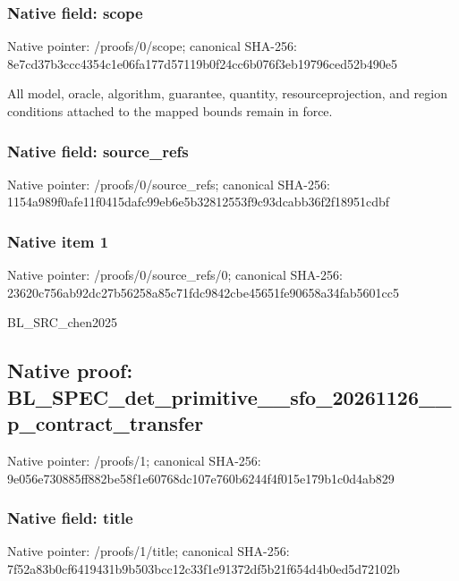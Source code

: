 \documentclass[10pt,a4paper]{article}
\begin{document}
\subsubsection{Native field: scope}


Native pointer: /proofs/0/scope; canonical SHA-256: 8e7cd37b3ccc4354c1e06fa1\allowbreak{}77d57119b0f24cc6b076f3eb\allowbreak{}19796ced52b490e5


All model, oracle, algorithm, guarantee, quantity, resourceprojection, and region conditions attached to the mapped bounds remain in force.


\subsubsection{Native field: source\_refs}


Native pointer: /proofs/0/source\_refs; canonical SHA-256: 1154a989f0afe11f0415dafc\allowbreak{}99eb6e5b32812553f9c93dca\allowbreak{}bb36f2f18951cdbf



\subsubsection{Native item 1}


Native pointer: /proofs/0/source\_refs/0; canonical SHA-256: 23620c756ab92dc27b56258a\allowbreak{}85c71fdc9842cbe45651fe90\allowbreak{}658a34fab5601cc5


BL\_SRC\_chen2025


\subsection{Native proof: BL\_SPEC\_det\_primitive\_\_s\allowbreak{}fo\_20261126\_\_p\_contract\_\allowbreak{}transfer}


Native pointer: /proofs/1; canonical SHA-256: 9e056e730885ff882be58f1e\allowbreak{}60768dc107e760b6244f4f01\allowbreak{}5e179b1c0d4ab829



\subsubsection{Native field: title}


Native pointer: /proofs/1/title; canonical SHA-256: 7f52a83b0cf6419431b9b503\allowbreak{}bcc12c33f1e91372df5b21f6\allowbreak{}54d4b0ed5d72102b
\end{document}
